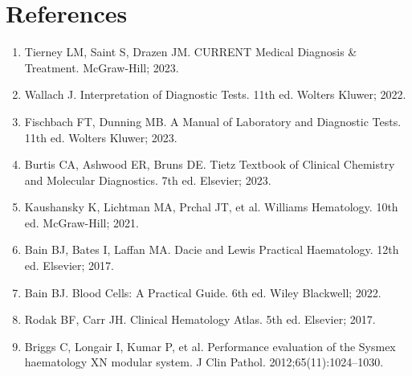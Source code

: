 \section*{References}
\begin{enumerate}
  \item Tierney LM, Saint S, Drazen JM. CURRENT Medical Diagnosis \& Treatment. McGraw-Hill; 2023.
  \item Wallach J. Interpretation of Diagnostic Tests. 11th ed. Wolters Kluwer; 2022.
  \item Fischbach FT, Dunning MB. A Manual of Laboratory and Diagnostic Tests. 11th ed. Wolters Kluwer; 2023.
  \item Burtis CA, Ashwood ER, Bruns DE. Tietz Textbook of Clinical Chemistry and Molecular Diagnostics. 7th ed. Elsevier; 2023.
  \item Kaushansky K, Lichtman MA, Prchal JT, et al. Williams Hematology. 10th ed. McGraw-Hill; 2021.
  \item Bain BJ, Bates I, Laffan MA. Dacie and Lewis Practical Haematology. 12th ed. Elsevier; 2017.
  \item Bain BJ. Blood Cells: A Practical Guide. 6th ed. Wiley Blackwell; 2022.
  \item Rodak BF, Carr JH. Clinical Hematology Atlas. 5th ed. Elsevier; 2017.
  \item Briggs C, Longair I, Kumar P, et al. Performance evaluation of the Sysmex haematology XN modular system. J Clin Pathol. 2012;65(11):1024--1030.
\end{enumerate}

\clearpage
